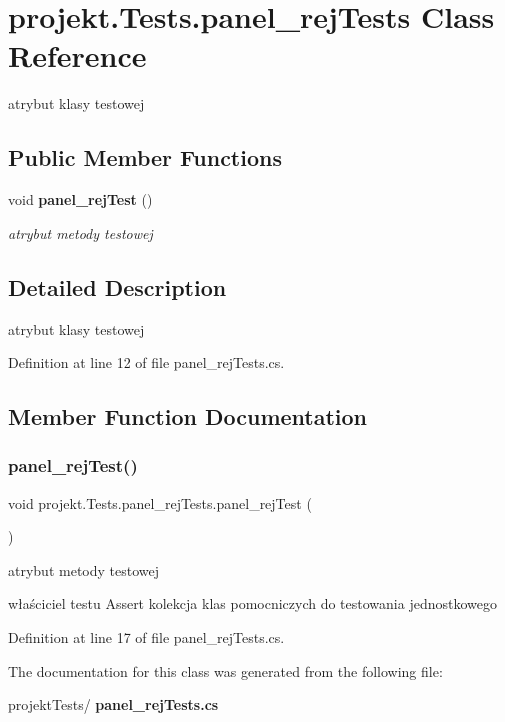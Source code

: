 \section{projekt.\+Tests.\+panel\+\_\+rej\+Tests Class Reference}
\label{classprojekt_1_1Tests_1_1panel__rejTests}


atrybut klasy testowej  


\subsection*{Public Member Functions}
\begin{DoxyCompactItemize}
\item 
void \textbf{ panel\+\_\+rej\+Test} ()
\begin{DoxyCompactList}\small\item\em atrybut metody testowej \end{DoxyCompactList}\end{DoxyCompactItemize}


\subsection{Detailed Description}
atrybut klasy testowej 

Definition at line 12 of file panel\+\_\+rej\+Tests.\+cs.



\subsection{Member Function Documentation}
\mbox{\label{classprojekt_1_1Tests_1_1panel__rejTests_a95609fea527ffdbe58e63472bea8e84c}} 
\subsubsection{panel\+\_\+rej\+Test()}
{\footnotesize\ttfamily void projekt.\+Tests.\+panel\+\_\+rej\+Tests.\+panel\+\_\+rej\+Test (\begin{DoxyParamCaption}{ }\end{DoxyParamCaption})\hspace{0.3cm}{\ttfamily [inline]}}



atrybut metody testowej 

właściciel testu Assert kolekcja klas pomocniczych do testowania jednostkowego 

Definition at line 17 of file panel\+\_\+rej\+Tests.\+cs.



The documentation for this class was generated from the following file\+:\begin{DoxyCompactItemize}
\item 
projekt\+Tests/\textbf{ panel\+\_\+rej\+Tests.\+cs}\end{DoxyCompactItemize}
